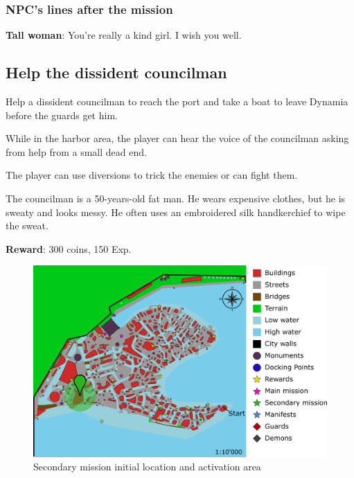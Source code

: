 \subsubsection*{NPC's lines after the mission}
\textbf{Tall woman}: You're really a kind girl. I wish you well.



\subsection{Help the dissident councilman}
Help a dissident councilman to reach the port and take a boat to leave Dynamia before the guards get him.

While in the harbor area, the player can hear the voice of the councilman asking from help from a small dead end.

The player can use diversions to trick the enemies or can fight them.

The councilman is a 50-years-old fat man. He wears expensive clothes, but he is sweaty and looks messy. He often uses an embroidered silk handkerchief to wipe the sweat.

\textbf{Reward}: 300 coins, 150 Exp.

\begin{figure}[H]
  \centering
  \includegraphics[width=\textwidth]{../Images/Maps/dynamiaSecondaryMissions_Councilman}
  \caption{Secondary mission initial location and activation area}
\end{figure}

